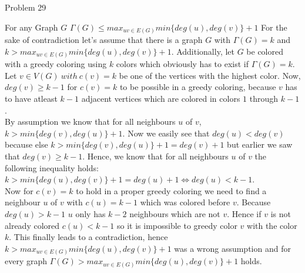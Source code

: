 \documentclass[a4paper]{article}
\begin{document}
\begin{solution}{Problem 29}
		
		\begin{theorem}{For any Graph $G$  $\Gamma(G) \leq max_{uv \in E(G)} min\{deg(u), deg(v)\} + 1$}
		For the sake of contradiction let's assume that there is a graph $G$ with $\Gamma(G) = k$ and $k > max_{uv \in E(G)} min\{deg(u), deg(v)\} + 1$. 
		Additionally, let $G$ be colored with a greedy coloring using $k$ colors which obviously has to exist if $\Gamma(G) = k$. \\
		Let $v \in V(G)\ with\ c(v) = k$ be one of the vertices with the highest color. 
		Now, $deg(v) \geq k-1$  for $c(v)=k$ to be possible in a greedy coloring, because $v$ has to have atleast $k-1$ adjacent vertices which are colored in colors $1$ through $k-1$. \\
		By assumption we know that for all neighbours $u$ of $v$, $k> min\{deg(v), deg(u)\} + 1$. 
		Now we easily see that $deg(u) < deg(v)$ because else  $k > min\{deg(v), deg(u)\} + 1 = deg(v) + 1$ but earlier we saw that $deg(v) \geq k-1$. 
		Hence, we know that for all neighbours $u$ of $v$ the following inequality holds: $k > min\{deg(u), deg(v)\} + 1 = deg(u) + 1 \Leftrightarrow deg(u) < k - 1$. \\
		Now for $c(v)=k$ to hold in a proper greedy coloring we need to find a neighbour $u$ of $v$ with $c(u)=k-1$ which was colored before $v$. 
		Because $deg(u) > k-1$ $u$ only has $k-2$ neighbours which are not $v$. 
		Hence if $v$ is not already colored $c(u) < k-1$ so it is impossible to greedy color $v$ with the color $k$. 
		This finally leads to a contradiction, hence $k > max_{uv \in E(G)} min\{deg(u), deg(v)\} + 1$ was a wrong assumption and for every graph $\Gamma(G) > max_{uv \in E(G)} min\{deg(u), deg(v)\} + 1$ holds.
		\end{theorem}
	\end{solution}
	\newpage
\end{document}
